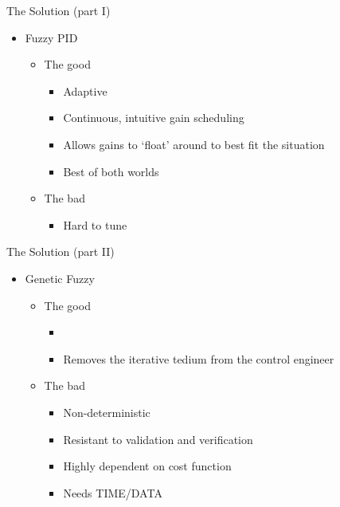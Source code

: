 \documentclass[]{beamer}
\begin{document}
\begin{frame}{The Solution (part I)}
\begin{itemize}
\item Fuzzy PID
    \begin{itemize}
    \item The good
        \begin{itemize}
        \item Adaptive
        \item Continuous, intuitive gain scheduling
        \item Allows gains to `float' around to best fit the situation
        \item Best of both worlds
        \end{itemize}
    \item The bad
        \begin{itemize}
        \item Hard to tune
        \end{itemize}
    \end{itemize}
\end{itemize}
\end{frame}


\begin{frame}{The Solution (part II)}
\begin{itemize}
\item Genetic Fuzzy
    \begin{itemize}
    \item The good
        \begin{itemize}
        \item{}
        \item<3-> Removes the iterative tedium from the control engineer
        \end{itemize}
    \item<4-> The bad
        \begin{itemize}
        \item<5-> Non-deterministic
        \item<6-> Resistant to validation and verification
        \item<7-> Highly dependent on cost function
        \item<8-> Needs TIME/DATA
        \end{itemize}
    \end{itemize}
\end{itemize}
\end{frame}
\end{document}
